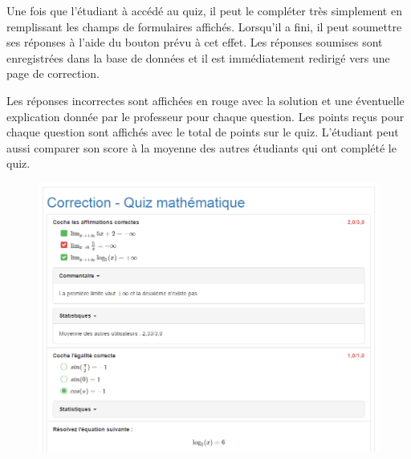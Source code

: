 \documentclass[a4,10pt,french]{sphinxmanual}
\begin{document}
Une fois que l'étudiant à accédé au quiz, il peut le compléter très simplement en remplissant les champs de formulaires affichés. Lorsqu'il a fini, il peut soumettre ses réponses à l'aide du bouton prévu à cet effet. Les réponses soumises sont enregistrées dans la base de données et il est immédiatement redirigé vers une page de correction.

Les réponses incorrectes sont affichées en rouge avec la solution et une éventuelle explication donnée par le professeur pour chaque question. Les points reçus pour chaque question sont affichés avec le total de points sur le quiz. L'étudiant peut aussi comparer son score à la moyenne des autres étudiants qui ont complété le quiz.
\begin{figure}[htbp]
\centering

\includegraphics{correct.png}
\end{figure}
\end{document}
